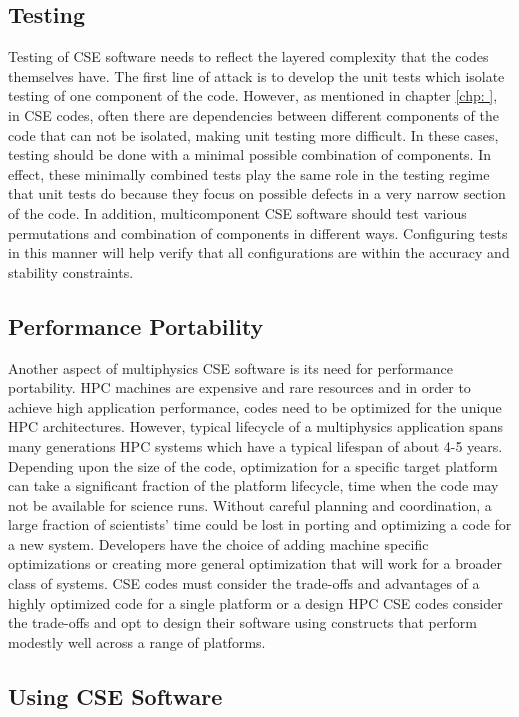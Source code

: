 \subsection{Testing}
\label{sec:testing}
Testing of CSE software needs to reflect the layered complexity that
the codes themselves have. The first line of attack is to develop the unit tests which isolate testing of one component of the code.
However, as mentioned in chapter \ref{chp: }, in CSE codes, often there are dependencies between different components of the code that can not be isolated, making unit testing more difficult. In these cases, testing should be done with a minimal possible combination of
components.  In effect, these
minimally combined tests play the same role in the testing regime that
unit tests do because they focus on possible defects in a very narrow
section of the code. In addition, multicomponent CSE software should test various 
permutations and combination of components in different ways. Configuring tests in this manner will help verify
that all configurations are within the accuracy and stability
constraints.  

\subsection{Performance Portability}
\label{sec:perfport}

Another aspect of multiphysics CSE software is its need for
performance portability. HPC machines are expensive and rare resources and in order to achieve high application performance, codes need to be optimized for the unique HPC architectures.
 However, typical lifecycle of a
multiphysics application spans many generations HPC systems which have a typical lifespan of about 4-5 years.  Depending upon the size of the
code, optimization for a specific target platform can take a
significant fraction of the platform lifecycle, time when the code may not be available for science runs.  Without careful planning and coordination,  a
large fraction of scientists' time could be lost in porting and optimizing
a code for a new system.  Developers have the choice of adding machine specific optimizations or creating more general optimization that will work for a broader class of systems.  CSE codes must consider the trade-offs and advantages of a highly optimized code for a single platform or a design 
HPC CSE codes consider the trade-offs and opt to design their software
using constructs that perform modestly well across a range of
platforms. 



\subsection{Using CSE Software}

